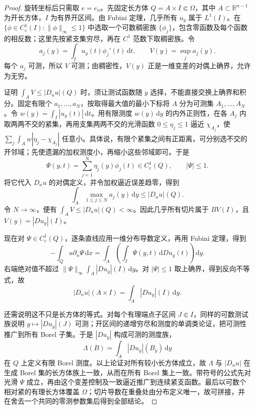 \begin{proof}
	旋转坐标后只需取 \(e=e_n\)。先固定长方体 \(Q=A\times I\Subset\Omega\)，其中 \(A\subset\mathbb R^{n-1}\) 为开长方体，\(I\) 为有界开区间。由 Fubini 定理，几乎所有 \(u_y\) 属于 \(L^1(I)\)。在
	\(\{\phi\in C_c^1(I):\|\phi\|_\infty\le1\}\) 中选取一个可数稠密族 \(\{\phi_j\}\)，包含零函数及每个函数的相反数；这里先按紧支集穷尽，再在 \(C^1\) 范数下取稠密族。令
	\[
		a_j(y)=\int_Iu_y(t)\phi_j'(t)\,\mathrm dt,
		\qquad V(y)=\sup_j a_j(y).
	\]
	每个 \(a_j\) 可测，所以 \(V\) 可测；由稠密性，\(V(y)\) 正是一维变差的对偶上确界，允许为无穷。

	证明 \(\int_AV\le|D_nu|(Q)\) 时，须让测试函数随 \(y\) 选择，不能直接交换上确界和积分。固定有限个 \(a_1,\ldots,a_N\)，按取得最大值的最小下标将 \(A\) 分为可测集 \(A_1,\ldots,A_N\)。令
	\(w(y)=\int_I|u_y(t)|\,\mathrm dt\)。用有限测度 \(w(y)\,\mathrm dy\) 的内外正则性，在各 \(A_j\) 内取两两不交的紧集，再用支集两两不交的光滑函数 \(0\le\eta_j\le1\) 逼近 \(\chi_{A_j}\)，使
	\(\sum_j\int_Aw|\eta_j-\chi_{A_j}|\)
	任意小。具体说，有限个紧集之间有正距离，可分别选不交的开邻域；先使遗漏的加权测度小，再缩小这些邻域即可。于是
	\[
		\Psi(y,t)=\sum_{j=1}^N\eta_j(y)\phi_j(t)\in C_c^1(Q),\qquad |\Psi|\le1.
	\]
	将它代入 \(D_nu\) 的对偶定义，并令加权逼近误差趋零，得到
	\[
		\int_A\max_{1\le j\le N}a_j(y)\,\mathrm dy\le|D_nu|(Q).
	\]
	令 \(N\to\infty\)，便有 \(\int_AV\le|D_nu|(Q)<\infty\)。因此几乎所有切片属于 \(BV(I)\)，且 \(V(y)=|Du_y|(I)\)。

	现在对 \(\Psi\in C_c^1(Q)\)，逐条直线应用一维分布导数定义，再用 Fubini 定理，得到
	\[
		-\int_Q u\partial_n\Psi\,\mathrm dx
		=\int_A\left(\int_I\Psi(y,t)\,\mathrm dDu_y(t)\right)\mathrm dy.
	\]
	右端绝对值不超过 \(\|\Psi\|_\infty\int_A|Du_y|(I)\,\mathrm dy\)。对 \(|\Psi|\le1\) 取上确界，得到反向不等式，故
	\[
		|D_nu|(A\times I)=\int_A|Du_y|(I)\,\mathrm dy.
	\]

	还需说明这不只是长方体的等式。对每个有理端点子区间 \(J\Subset I\)，同样的可数测试族说明 \(y\mapsto|Du_y|(J)\) 可测；开区间的递增穷尽和测度的单调类论证，把可测性推广到所有 Borel 子集。于是 \(|Du_y|\) 构成可测的测度族，
	\[
		\Lambda(B)=\int_A|Du_y|(B_y)\,\mathrm dy
	\]
	在 \(Q\) 上定义有限 Borel 测度。以上论证对所有较小长方体成立，故 \(\Lambda\) 与 \(|D_nu|\) 在生成 Borel 集的长方体族上一致，从而在所有 Borel 集上一致。带符号的公式先对光滑 \(\Psi\) 成立，再由这个变差控制及一致逼近推广到连续紧支函数。最后以可数个相对紧的有理长方体覆盖 \(\Omega\)；切片导数在重叠处由分布定义唯一，故可拼接，并在舍去一个共同的零测参数集后得到全部结论。
\end{proof}

